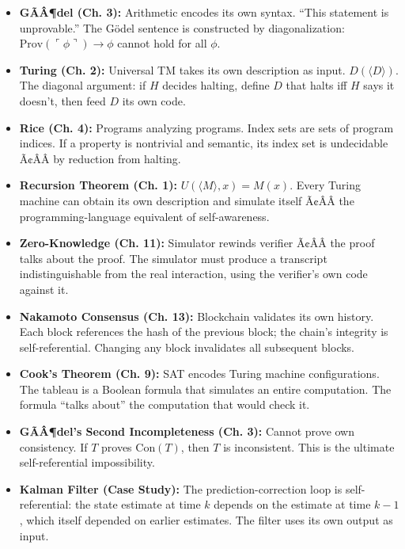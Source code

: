 \begin{itemize}
\item \textbf{GÃÂ¶del (Ch. 3):} Arithmetic encodes its own syntax. ``This statement is unprovable.'' The G\"odel sentence is constructed by diagonalization: $\text{Prov}(\ulcorner\phi\urcorner) \to \phi$ cannot hold for all $\phi$.

\item \textbf{Turing (Ch. 2):} Universal TM takes its own description as input. $D(\langle D \rangle)$. The diagonal argument: if $H$ decides halting, define $D$ that halts iff $H$ says it doesn't, then feed $D$ its own code.

\item \textbf{Rice (Ch. 4):} Programs analyzing programs. Index sets are sets of program indices. If a property is nontrivial and semantic, its index set is undecidable Ã¢ÂÂ by reduction from halting.

\item \textbf{Recursion Theorem (Ch. 1):} $U(\langle M \rangle, x) = M(x)$. Every Turing machine can obtain its own description and simulate itself Ã¢ÂÂ the programming-language equivalent of self-awareness.

\item \textbf{Zero-Knowledge (Ch. 11):} Simulator rewinds verifier Ã¢ÂÂ the proof talks about the proof. The simulator must produce a transcript indistinguishable from the real interaction, using the verifier's own code against it.

\item \textbf{Nakamoto Consensus (Ch. 13):} Blockchain validates its own history. Each block references the hash of the previous block; the chain's integrity is self-referential. Changing any block invalidates all subsequent blocks.

\item \textbf{Cook's Theorem (Ch. 9):} SAT encodes Turing machine configurations. The tableau is a Boolean formula that simulates an entire computation. The formula ``talks about'' the computation that would check it.

\item \textbf{GÃÂ¶del's Second Incompleteness (Ch. 3):} Cannot prove own consistency. If $T$ proves $\text{Con}(T)$, then $T$ is inconsistent. This is the ultimate self-referential impossibility.

\item \textbf{Kalman Filter (Case Study):} The prediction-correction loop is self-referential: the state estimate at time $k$ depends on the estimate at time $k-1$, which itself depended on earlier estimates. The filter uses its own output as input.


\end{itemize}
